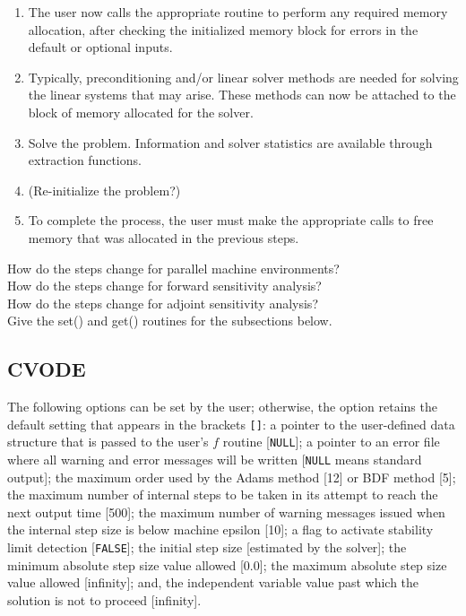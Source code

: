 \begin{enumerate}
\item The user now calls the appropriate routine to perform
any required memory allocation, after checking the initialized memory
block for errors in the default or optional inputs.

\item Typically, preconditioning and/or linear solver methods are
needed for solving the linear systems that may arise. These methods
can now be attached to the block of memory allocated for the solver.

\item Solve the problem. Information and solver statistics are
available through extraction functions.

\item (Re-initialize the problem?)

\item To complete the process, the user must make the appropriate calls to
free memory that was allocated in the previous steps.

\end{enumerate}

How do the steps change for parallel machine environments? \\
How do the steps change for forward sensitivity analysis? \\
How do the steps change for adjoint sensitivity analysis? \\
Give the set() and get() routines for the subsections below. \\

\subsection{CVODE}

The following options can be set by the user; otherwise, the option
retains the default setting that appears in the brackets {\tt []}:
a pointer to the user-defined data structure that is passed to the
user's $f$ routine [{\tt NULL}]; a pointer to an error file where all
warning and error messages will be written [{\tt NULL} means standard
output]; the maximum order used by the Adams method [12] or BDF method
[5]; the maximum number of internal steps to be taken in its attempt
to reach the next output time [500]; the maximum number of warning
messages issued when the internal step size is below machine epsilon
[10]; a flag to activate stability limit detection [{\tt FALSE}]; the
initial step size [estimated by the solver]; the minimum absolute step
size value allowed [0.0]; the maximum absolute step size value allowed
[infinity]; and, the independent variable value past which the
solution is not to proceed [infinity].

